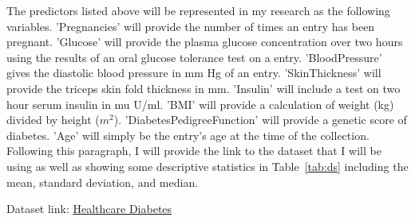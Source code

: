 \documentclass[12pt]{article}
\begin{document}
    \begin{table}[ht]
    \caption{Head of the Dataset}
    \centering
    \label{tab:head_of_data}
    \end{table}
    
    The predictors listed above will be represented in my research as the following variables. 'Pregnancies' will provide the number of 
    times an entry has been pregnant. 'Glucose' will provide the plasma glucose concentration over two hours using the results of an oral 
    glucose tolerance test on a entry. 'BloodPressure' gives the diastolic blood pressure in mm Hg of an entry. 'SkinThickness' will 
    provide the triceps skin fold thickness in mm. 'Insulin' will include a test on two hour serum insulin in mu U/ml. 'BMI' will provide a 
    calculation of weight (kg) divided by height ($m^2$). 'DiabetesPedigreeFunction' will provide a genetic score of diabetes. 'Age' will 
    simply be the entry's age at the time of the collection. Following this paragraph, I will provide the link to the dataset that I will 
    be using as well as showing some descriptive statistics in Table~\ref{tab:ds} including the mean, standard deviation, and median.  

Dataset link: \href{https://www.kaggle.com/datasets/nanditapore/healthcare-diabetes}{Healthcare Diabetes}
\end{document}
